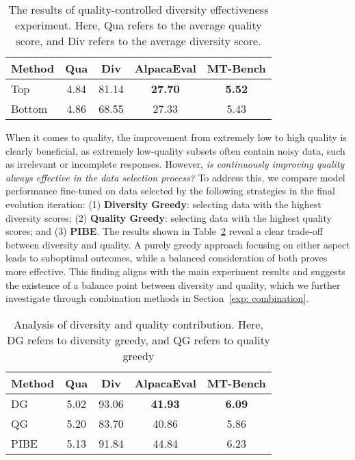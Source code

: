 \begin{table}[htbp]
    \centering
    \small
    \begin{tabular}{l|cc|cc}
    \toprule
    Method  & Qua & Div & AlpacaEval & MT-Bench \\  
    \midrule
    Top & 4.84 & 81.14 & \textbf{27.70} & \textbf{5.52} \\
    Bottom & 4.86 & 68.55 & 27.33 & 5.43 \\
    \bottomrule
    \end{tabular}
    \caption{The results of quality-controlled diversity effectiveness experiment. Here, Qua refers to the average quality score, and Div refers to the average diversity score.}
    \label{tab: qc_diversity}
\end{table}

When it comes to quality, the improvement from extremely low to high quality is clearly beneficial, as extremely low-quality subsets often contain noisy data, such as irrelevant or incomplete responses. However, \emph{is continuously improving quality always effective in the data selection process?} To address this, we compare model performance fine-tuned on data selected by the following strategies in the final evolution iteration: (1) \textbf{Diversity Greedy}: selecting data with the highest diversity scores; (2) \textbf{Quality Greedy}: selecting data with the highest quality scores; and (3) \textbf{PIBE}. The results shown in Table~\ref{tab: analysis_div_and_qua} reveal a clear trade-off between diversity and quality. A purely greedy approach focusing on either aspect leads to suboptimal outcomes, while a balanced consideration of both proves more effective. This finding aligns with the main experiment results and suggests the existence of a balance point between diversity and quality, which we further investigate through combination methods in Section~\ref{exp: combination}.


\begin{table}[htbp]
    \centering
    \small
    \begin{tabular}{l|cc|cc}
    \toprule
    Method  & Qua & Div & AlpacaEval & MT-Bench \\  
    \midrule
    DG & 5.02 & 93.06 & \textbf{41.93}  & \textbf{6.09} \\
    QG & 5.20 & 83.70 & 40.86  & 5.86 \\
    PIBE & 5.13 & 91.84 & 44.84 & 6.23 \\
    \bottomrule
    \end{tabular}
    \caption{Analysis of diversity and quality contribution. Here, DG refers to diversity greedy, and QG refers to quality greedy}
    \label{tab: analysis_div_and_qua}
\end{table}

